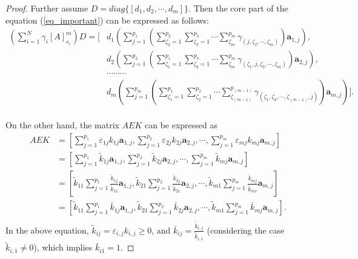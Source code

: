 \documentclass{article}
\newtheorem{proof}{Proof}
\begin{document}
\begin{proof}
Further assume $D=diag\{[d_1,d_2,\cdots, d_m]\}$.  Then the core part of the equation (\ref{eq_important}) can be expressed as follows:
\begin{equation} \label{carefu}
\begin{aligned}
     (\sum_{i=1}^{N} \gamma_i  [A]^m_{s_i})  D  
=[& d_1 ( \sum_{j=1}^{p_1} (\sum_{\zeta_2=1}^{p_2} \sum_{\zeta_3=1}^{p_3} \cdots \sum_{\zeta_m}^{p_m} \gamma_{( j, \zeta_2, \cdots, \zeta_m )} ) \boldsymbol{a}_{1,j} ), \\
     & d_2 ( \sum_{j=1}^{p_2} (\sum_{\zeta_1=1}^{p_1} \sum_{\zeta_3=1}^{p_3} \cdots \sum_{\zeta_m}^{p_m} \gamma_{( \zeta_1, j, \zeta_3, \cdots, \zeta_m )} ) \boldsymbol{a}_{2,j} ), \\
     & \cdots \cdots \cdots \\
      & d_m  ( \sum_{j=1}^{p_m} (\sum_{\zeta_1=1}^{p_1} \sum_{\zeta_2=1}^{p_2} \cdots \sum_{\zeta_{(m-1)}}^{p_{(m-1)}} \gamma_{( \zeta_1, \zeta_2, \cdots, \zeta_{(m-1)},j)} ) \boldsymbol{a}_{m,j} ) ].\\  
\end{aligned}
\end{equation}

On the other hand, the matrix $AEK$ can be expressed as 
\begin{equation}\label{eq_li_comb1}
\begin{aligned}
AEK &= [ \sum_{j=1}^{p_1} \varepsilon_{1j} k_{1j} \boldsymbol{a}_{1,j}, \sum_{j=1}^{p_2} \varepsilon_{2j} k_{2j} \boldsymbol{a}_{2,j}, \cdots, \sum_{j=1}^{p_m} \varepsilon_{mj} k_{mj} \boldsymbol{a}_{m,j}]\\
& = [ \sum_{j=1}^{p_1} \tilde {k}_{1j} \boldsymbol{a}_{1,j}, \sum_{j=1}^{p_2} \tilde {k}_{2j} \boldsymbol{a}_{2,j}, \cdots, \sum_{j=1}^{p_m} \tilde {k}_{mj} \boldsymbol{a}_{m,j}]\\
& = [ \tilde {k}_{11} \sum_{j=1}^{p_1} \frac{\tilde {k}_{1j}}{\tilde {k}_{11}}  \boldsymbol{a}_{1,j}, \tilde {k}_{21} \sum_{j=1}^{p_2} \frac{\tilde {k}_{2j}}{\tilde {k}_{21}}  \boldsymbol{a}_{2,j}, \cdots, \tilde {k}_{m1} \sum_{j=1}^{p_m} \frac{\tilde {k}_{mj}}{\tilde {k}_{m1}} \boldsymbol{a}_{m,j}]\\
& = [ \tilde {k}_{11} \sum_{j=1}^{p_1} \bar {k}_{1j} \boldsymbol{a}_{1,j}, \tilde {k}_{21} \sum_{j=1}^{p_2} \bar {k}_{2j} \boldsymbol{a}_{2,j}, \cdots, \tilde {k}_{m1} \sum_{j=1}^{p_m} \bar {k}_{mj} \boldsymbol{a}_{m,j}].\\
\end{aligned}
\end{equation}
In the above equation, $\tilde {k}_{ij} = \varepsilon_{i,j} k_{i,j} \ge 0$, and  $\bar {k}_{ij} = \frac{\tilde {k}_{i,j}}{\tilde {k}_{i,1}}$ (considering the case $\tilde {k}_{i,1} \ne 0$), which implies $\bar {k}_{i1}=1$.


\end{proof}
\end{document}
